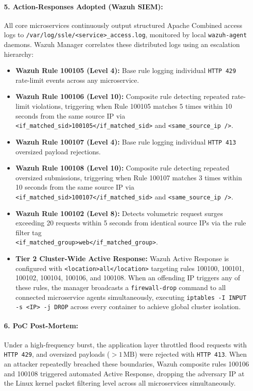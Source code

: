 \paragraph{5. Action-Responses Adopted (Wazuh SIEM):}
All core microservices continuously output structured Apache Combined access logs to \texttt{/var/log/ssle/}\allowbreak\texttt{<service>\_access.log}, monitored by local \texttt{wazuh-agent} daemons. Wazuh Manager correlates these distributed logs using an escalation hierarchy:
\begin{itemize}
    \item \textbf{Wazuh Rule 100105 (Level 4):} Base rule logging individual \texttt{HTTP 429} rate-limit events across any microservice.
    \item \textbf{Wazuh Rule 100106 (Level 10):} Composite rule detecting repeated rate-limit violations, triggering when Rule 100105 matches 5 times within 10 seconds from the same source IP via \texttt{<if\_matched\_sid>100105</if\_matched\_sid>} and \texttt{<same\_source\_ip />}.
    \item \textbf{Wazuh Rule 100107 (Level 4):} Base rule logging individual \texttt{HTTP 413} oversized payload rejections.
    \item \textbf{Wazuh Rule 100108 (Level 10):} Composite rule detecting repeated oversized submissions, triggering when Rule 100107 matches 3 times within 10 seconds from the same source IP via \texttt{<if\_matched\_sid>100107</if\_matched\_sid>} and \texttt{<same\_source\_ip />}.
    \item \textbf{Wazuh Rule 100102 (Level 8):} Detects volumetric request surges exceeding 20 requests within 5 seconds from identical source IPs via the rule filter tag\\ \texttt{<if\_matched\_group>web</if\_matched\_group>}.
    \item \textbf{Tier 2 Cluster-Wide Active Response:} Wazuh Active Response is configured with \texttt{<location>all</location>} targeting rules 100100, 100101, 100102, 100104, 100106, and 100108. When an offending IP triggers any of these rules, the manager broadcasts a \texttt{firewall-drop} command to all connected microservice agents simultaneously, executing \texttt{iptables -I INPUT -s <IP> -j DROP} across every container to achieve global cluster isolation.
\end{itemize}

\paragraph{6. PoC Post-Mortem:}
Under a high-frequency burst, the application layer throttled flood requests with \texttt{HTTP 429}, and oversized payloads ($>1\,\text{MB}$) were rejected with \texttt{HTTP 413}. When an attacker repeatedly breached these boundaries, Wazuh composite rules 100106 and 100108 triggered automated Active Response, dropping the adversary IP at the Linux kernel packet filtering level across all microservices simultaneously.

